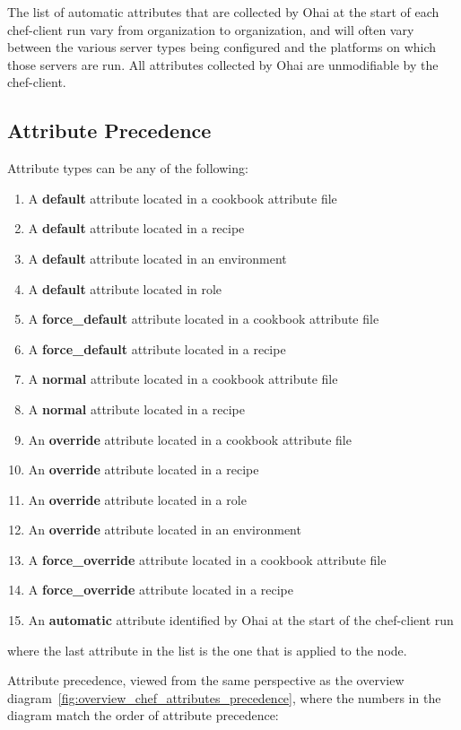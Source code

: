 The list of automatic attributes that are collected by Ohai at the start of each chef-client run vary from organization to organization, and will often vary between the various server types being configured and the platforms on which those servers are run. All attributes collected by Ohai are unmodifiable by the chef-client.

\subsection{Attribute Precedence}

Attribute types can be any of the following:

\begin{enumerate}
  \item A \textbf{default} attribute located in a cookbook attribute file
  \item A \textbf{default} attribute located in a recipe
  \item A \textbf{default} attribute located in an environment
  \item A \textbf{default} attribute located in role
  \item A \textbf{force\_default} attribute located in a cookbook attribute file
  \item A \textbf{force\_default} attribute located in a recipe
  \item A \textbf{normal} attribute located in a cookbook attribute file
  \item A \textbf{normal} attribute located in a recipe
  \item An \textbf{override} attribute located in a cookbook attribute file
  \item An \textbf{override} attribute located in a recipe
  \item An \textbf{override} attribute located in a role
  \item An \textbf{override} attribute located in an environment
  \item A \textbf{force\_override} attribute located in a cookbook attribute file
  \item A \textbf{force\_override} attribute located in a recipe
  \item An \textbf{automatic} attribute identified by Ohai at the start of the chef-client run
\end{enumerate}

where the last attribute in the list is the one that is applied to the node.

Attribute precedence, viewed from the same perspective as the overview diagram~\ref{fig:overview_chef_attributes_precedence}, where the numbers in the diagram match the order of attribute precedence:

